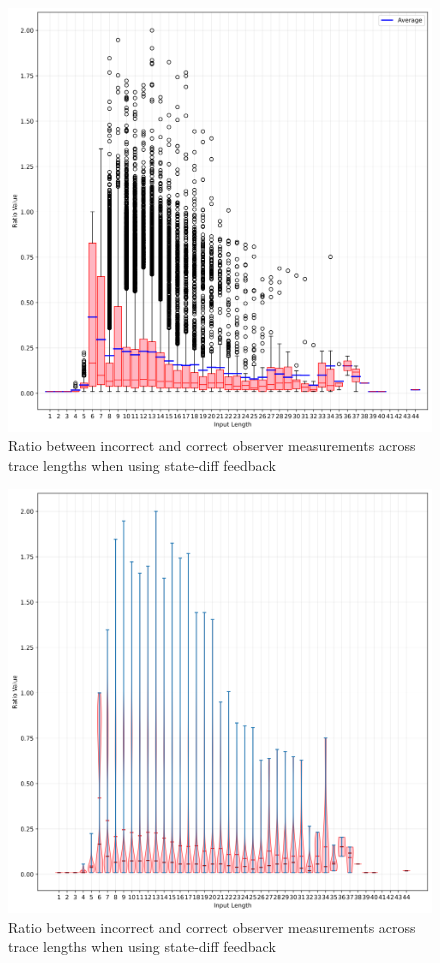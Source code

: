 \documentclass[twocolumn]{article}
\begin{document}
\begin{figure}
  \includegraphics[width=\columnwidth]{assets/consistency/state-diff-boxplot.png}
  \caption{Ratio between incorrect and correct observer measurements across trace lengths when using state-diff feedback}
  \label{fig:state-diff-inter-boxplot}
\end{figure}
\begin{figure}
  \includegraphics[width=\columnwidth]{assets/consistency/state-diff-violin.png}
  \caption{Ratio between incorrect and correct observer measurements across trace lengths when using state-diff feedback}
  \label{fig:state-diff-inter-violin}
\end{figure}
\end{document}
